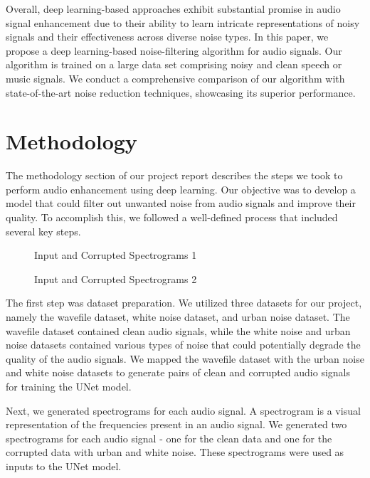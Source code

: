 \documentclass[conference]{IEEEtran}
\begin{document}
Overall, deep learning-based approaches exhibit substantial promise in audio signal enhancement due to their ability to learn intricate representations of noisy signals and their effectiveness across diverse noise types.\cite{xu2013experimental} In this paper, we propose a deep learning-based noise-filtering algorithm for audio signals. Our algorithm is trained on a large data set comprising noisy and clean speech or music signals. We conduct a comprehensive comparison of our algorithm with state-of-the-art noise reduction techniques, showcasing its superior performance.

\section{Methodology}
The methodology section of our project report describes the steps we took to perform audio enhancement using deep learning. Our objective was to develop a model that could filter out unwanted noise from audio signals and improve their quality. To accomplish this, we followed a well-defined process that included several key steps.

\begin{figure}[b!]
    \centering
    
    \caption{Input and Corrupted Spectrograms 1}
    \label{fig:my_label}
\end{figure}

\begin{figure}[b!]
    \centering
    
    \caption{Input and Corrupted Spectrograms 2}
    \label{fig:my_label}
\end{figure}

The first step was dataset preparation. We utilized three datasets for our project, namely the wavefile dataset, white noise dataset, and urban noise dataset. The wavefile dataset contained clean audio signals, while the white noise and urban noise datasets contained various types of noise that could potentially degrade the quality of the audio signals. We mapped the wavefile dataset with the urban noise and white noise datasets to generate pairs of clean and corrupted audio signals for training the UNet model.

Next, we generated spectrograms for each audio signal. A spectrogram is a visual representation of the frequencies present in an audio signal. We generated two spectrograms for each audio signal - one for the clean data and one for the corrupted data with urban and white noise. These spectrograms were used as inputs to the UNet model.
\end{document}
